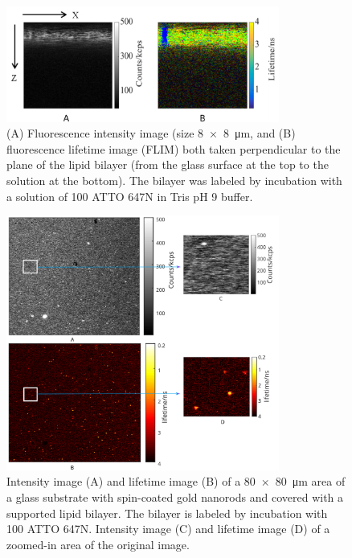 \begin{figure}[ht]
  \centering
  \includegraphics[width=0.8\textwidth]{xz_scan}
  \makeatletter
  \renewcommand{\fnum@figure}{\figurename~S\thefigure}
  \makeatother{}
  \caption{(A) Fluorescence intensity image (size \SI[product-units=repeat]{8x8}{\um}, and (B) fluorescence lifetime image (FLIM) both taken perpendicular to the plane of the lipid bilayer (from the glass surface at the top to the solution at the bottom).
  The bilayer was labeled by incubation with a solution of \SI{100}{\nM} ATTO 647N in Tris pH 9 buffer.}
  \label{SIfig:xz-scan}
\end{figure}

\begin{figure}[ht]
  \centering
  \includegraphics[width=0.8\textwidth]{xy_with_zoom}
  \makeatletter
  \renewcommand{\fnum@figure}{\figurename~S\thefigure}
  \makeatother{}
  \caption{ Intensity image (A) and lifetime image (B) of a \SI[product-units=repeat]{80x80}{\um} area of a glass substrate with spin-coated gold nanorods and covered with a supported lipid bilayer.
  The bilayer is labeled by incubation with \SI{100}{\nM} ATTO 647N.
  Intensity image (C) and lifetime image (D) of a zoomed-in area of the original image.}
  \label{SIfig:xy-scan}
\end{figure}


